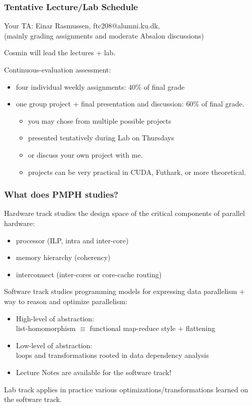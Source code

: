 \documentclass{beamer}
\begin{document}
\begin{frame}[fragile]
\frametitle{Tentative Lecture/Lab Schedule}

Your TA: Einar Rasmussen, ftc208@alumni.ku.dk,\\
(mainly grading assignments and moderate Absalon discussions)\bigskip

Cosmin will lead the lectures + lab.\bigskip

Continuous-evaluation assessment:
\begin{itemize}
    \item four individual weekly assignments: $40\%$ of final grade\medskip
    \item one group project + final presentation and discussion: $60\%$ of final grade.
        \begin{itemize}
            \item you may chose from multiple possible projects
            \item presented tentatively during Lab on Thursdays
            \item or discuss your own project with me.
            \item projects can be very practical in CUDA, Futhark, or more theoretical.
        \end{itemize}
\end{itemize} 
\end{frame}

\begin{frame}[fragile]
\frametitle{What does PMPH studies?}

Hardware track studies the design space of the critical components of parallel hardware:\medskip
    \begin{itemize}
        \item processor (ILP, intra and inter-core)\smallskip
        \item memory hierarchy (coherency)\smallskip
        \item interconnect (inter-cores or core-cache routing)\smallskip
    \end{itemize}
\bigskip
\pause

Software track studies programming models for expressing data parallelism + way to reason and optimize parallelism:\medskip
    \begin{itemize}
        \item High-level of abstraction:\\ 
                list-homomorphism $\equiv$ functional map-reduce style + flattening\smallskip
        \item Low-level of abstraction:\\
                loops and transformations rooted in data dependency analysis\smallskip
        \item Lecture Notes are available for the software track!
    \end{itemize}
\bigskip
\pause

Lab track applies in practice various optimizations/transformations learned on the software track.

\end{frame}
\end{document}
